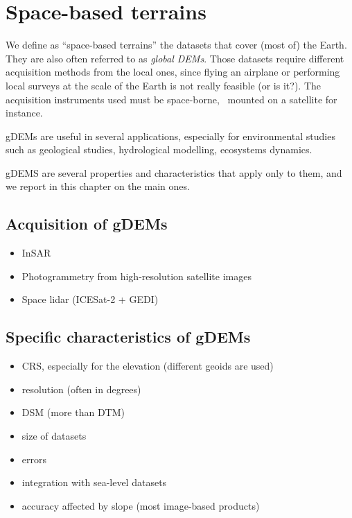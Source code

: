
\setchapterpreamble[u]{\margintoc}
\graphicspath{{spacedem/}}


\chapter{Space-based terrains}%
\label{chap:spacedem}

We define as ``space-based terrains'' the datasets that cover (most of) the Earth.
They are also often referred to as \emph{global DEMs}.
Those datasets require different acquisition methods from the local ones, since flying an airplane or performing local surveys at the scale of the Earth is not really feasible (or is it?).
The acquisition instruments used must be space-borne, \ie\ mounted on a satellite for instance.


gDEMs are useful in several applications, especially for environmental studies such as geological studies, hydrological modelling, ecosystems dynamics.

gDEMS are several properties and characteristics that apply only to them, and we report in this chapter on the main ones.


%
\section{Acquisition of gDEMs}

\begin{itemize}
  \item InSAR
  \item Photogrammetry from high-resolution satellite images
  \item Space lidar (ICESat-2 + GEDI)
\end{itemize}


%
\section[Specific characteristics]{Specific characteristics of gDEMs}

\begin{itemize}
  \item CRS, especially for the elevation (different geoids are used)
  \item resolution (often in degrees)
  \item DSM (more than DTM)
  \item size of datasets
  \item errors
  \item integration with sea-level datasets
  \item accuracy affected by slope (most image-based products)
\end{itemize}


